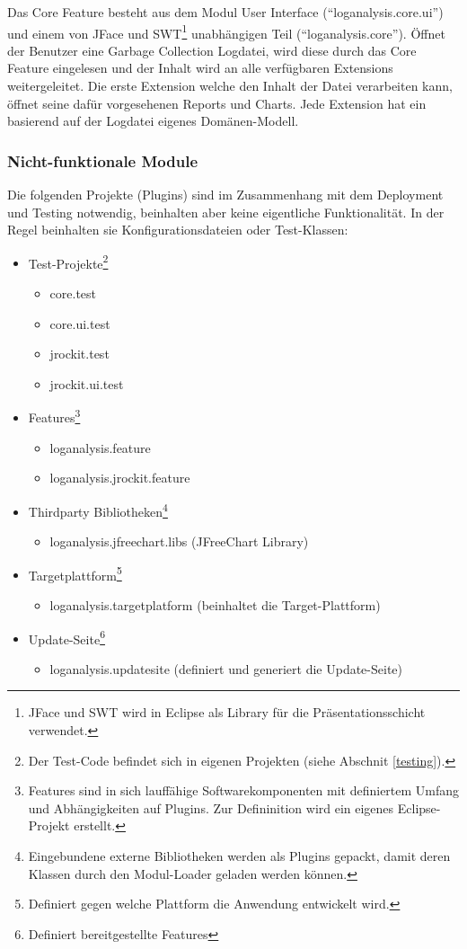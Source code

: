 Das Core Feature besteht aus dem Modul User Interface (``loganalysis.core.ui'') und einem von JFace und SWT\footnote{JFace und SWT wird in Eclipse als Library für die Präsentationsschicht verwendet.} unabhängigen Teil (``loganalysis.core''). Öffnet der Benutzer eine Garbage Collection Logdatei, wird diese durch das Core Feature eingelesen und der Inhalt wird an alle verfügbaren Extensions weitergeleitet. Die erste Extension welche den Inhalt der Datei verarbeiten kann, öffnet seine dafür vorgesehenen Reports und Charts. Jede Extension hat ein basierend auf der Logdatei eigenes Domänen-Modell.

\subsubsection{Nicht-funktionale Module}
Die folgenden Projekte (Plugins) sind im Zusammenhang mit dem Deployment und Testing notwendig, beinhalten aber keine eigentliche Funktionalität. In der Regel beinhalten sie Konfigurationsdateien oder Test-Klassen:
\begin{itemize}
	\item Test-Projekte\footnote{Der Test-Code befindet sich in eigenen Projekten (siehe Abschnit \ref{testing}).}
		\begin{itemize}
			\item core.test
			\item core.ui.test
			\item jrockit.test
			\item jrockit.ui.test
		\end{itemize}
	\item  Features\footnote{Features sind in sich lauffähige Softwarekomponenten mit definiertem Umfang und Abhängigkeiten auf Plugins. Zur Defininition wird ein eigenes Eclipse-Projekt erstellt.}
		\begin{itemize}
			\item loganalysis.feature
			\item loganalysis.jrockit.feature
		\end{itemize}
	\item  Thirdparty Bibliotheken\footnote{Eingebundene externe Bibliotheken werden als Plugins gepackt, damit deren Klassen durch den Modul-Loader geladen werden können.}
		\begin{itemize}
			\item  loganalysis.jfreechart.libs (JFreeChart Library)
		\end{itemize}
	\item  Targetplattform\footnote{Definiert gegen welche Plattform die Anwendung entwickelt wird.}
		\begin{itemize}
			\item  loganalysis.targetplatform (beinhaltet die Target-Plattform)
		\end{itemize}
	\item  Update-Seite\footnote{Definiert bereitgestellte Features}
		\begin{itemize}
			\item loganalysis.updatesite (definiert und generiert die Update-Seite)
		\end{itemize}
\end{itemize}


